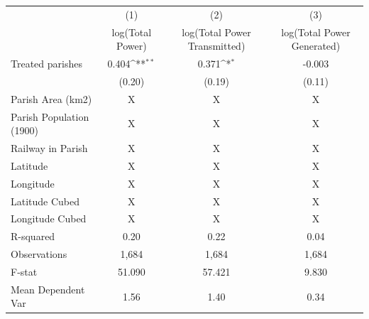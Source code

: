 {
\def\sym#1{\ifmmode^{#1}\else\(^{#1}\)\fi}
\begin{tabular}{l*{3}{c}}
\hline\hline
                    &\multicolumn{1}{c}{(1)}         &\multicolumn{1}{c}{(2)}         &\multicolumn{1}{c}{(3)}         \\
                    &log(Total Power)         &log(Total Power Transmitted)         &log(Total Power Generated)         \\
\hline
Treated parishes    &       0.404\sym{**} &       0.371\sym{*}  &      -0.003         \\
                    &      (0.20)         &      (0.19)         &      (0.11)         \\
\hline
Parish Area (km2)   &           X         &           X         &           X         \\
Parish Population (1900)&           X         &           X         &           X         \\
Railway in Parish   &           X         &           X         &           X         \\
Latitude            &           X         &           X         &           X         \\
Longitude           &           X         &           X         &           X         \\
Latitude Cubed      &           X         &           X         &           X         \\
Longitude Cubed     &           X         &           X         &           X         \\
\hline
R-squared           &        0.20         &        0.22         &        0.04         \\
Observations        &       1,684         &       1,684         &       1,684         \\
F-stat              &      51.090         &      57.421         &       9.830         \\
Mean Dependent Var  &        1.56         &        1.40         &        0.34         \\
\hline\hline
\end{tabular}
}
